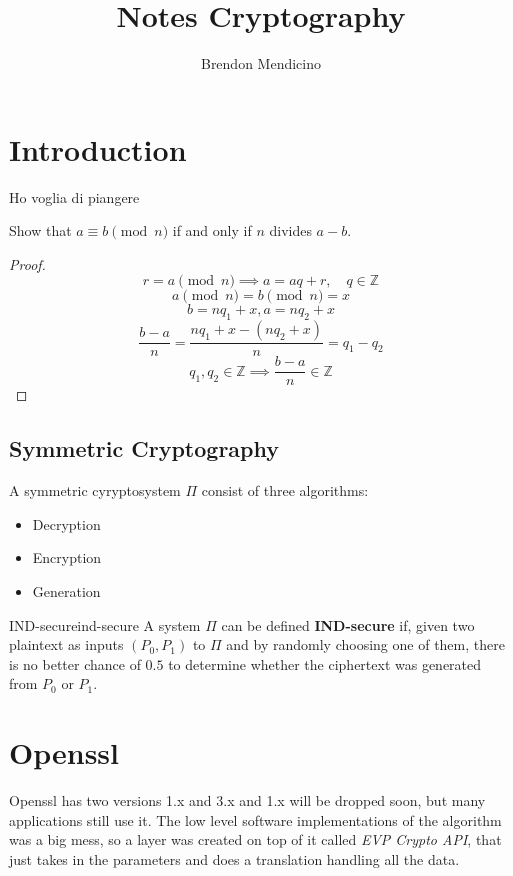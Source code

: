 \documentclass[12pt]{article}
\title{Notes Cryptography}
\author{Brendon Mendicino}
\begin{document}
\maketitle
\newpage
\tableofcontents
\newpage



\section{Introduction}
Ho voglia di piangere


\begin{example}{}{}
  Show that $ a \equiv b \pmod{n}$ if and only if $n$ divides $a - b$.
  \begin{proof}
    \[ r  = a \pmod{n} \implies a = aq + r, \quad q \in \mathbb{Z} \] 
    \[ a \pmod{n}  = b \pmod{n} = x \]
    \[ b  = nq_1 + x, a = nq_2 + x \]
    \[ \frac{b-a}{n}  = \frac{nq_1 + x - (nq_2 + x)}{n} = q_1 - q_2 \]
    \[ \boxed{ q_1, q_2  \in \mathbb{Z} \implies \frac{b-a}{n} \in \mathbb{Z} } \]
  \end{proof}
\end{example}

\subsection{Symmetric Cryptography}
A symmetric cyryptosystem $\Pi$ consist of three algorithms:
\begin{itemize}
  \item Decryption
  \item Encryption
  \item Generation
\end{itemize}
\begin{definition}{IND-secure}{ind-secure}
  A system $\Pi$ can be defined \textbf{IND-secure} if, given two plaintext as inputs $(P_0, P_1)$ to $\Pi$ and by randomly choosing one of them, there is no better chance of $0.5$ to determine whether the ciphertext was generated from $P_0$ or $P_1$.
\end{definition}



\section{Openssl}
Openssl has two versions 1.x and 3.x and 1.x will be dropped soon, but many applications still use it. The low level software implementations of the algorithm was a big mess, so a layer was created on top of it called \emph{EVP Crypto API}, that just takes in the parameters and does a translation handling all the data.
\end{document}
